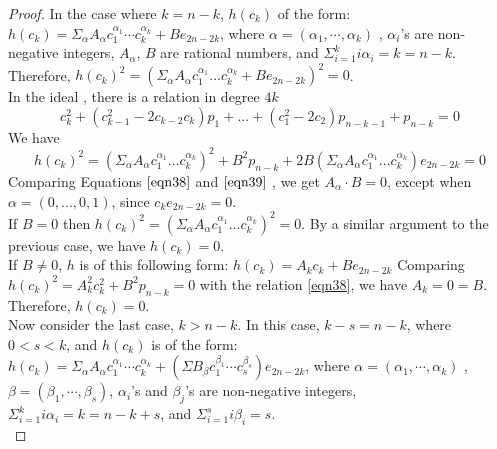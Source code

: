 \documentclass[a4paper,leqno,12pt]{amsart}
\theoremstyle{plain}
\theoremstyle{definition}
\theoremstyle{remark}
\begin{document}
{\begin{proof}
\noindent
In the case where $k = n-k$,    $h(c_{k})$ of the form:  
$h(c_{k}) = \Sigma_{\alpha} A_{\alpha} c_{1}^{\alpha_{1}} \cdots c_{k}^{\alpha_{k}} + Be_{2n-2k}$,  
where $\alpha = (\alpha_{1} ,  \cdots ,  \alpha_{k})$ ,  $\alpha_{i}$'s are non-negative integers,  $A_{\alpha}$,  $B$ are rational numbers,  and $\Sigma_{i=1}^{k} i \alpha_{i} = k = n-k$.    Therefore,  $h(c_{k})^{2}= (\Sigma_{\alpha} A_{\alpha} c_{1}^{\alpha_{1}}\dots c_{k}^{\alpha_{k}}+Be_{2n-2k})^{2}=0$. \\
In the  ideal ,  there is a relation in degree $4k$ 
\begin{equation}
\label{eqn38}
    c_{k}^{2}+(c_{k-1}^{2}-2c_{k-2}c_{k})p_{1}+...+(c_{1}^{2}-2c_{2})p_{n-k-1}+p_{n-k}=0
\end{equation}
\noindent
We have 
 \begin{equation}
 \label{eqn39}
    h(c_{k})^{2}= (\Sigma_{\alpha} A_{\alpha} c_{1}^{\alpha_{1}}\dots c_{k}^{\alpha_{k}})^{2}+B^{2}p_{n-k}+2B(\Sigma_{\alpha} A_{\alpha} c_{1}^{\alpha_{1}}\dots c_{k}^{\alpha_{k}})e_{2n-2k} = 0
 \end{equation}
\noindent
Comparing  Equations $\ref{eqn38}$ and $\ref{eqn39}$ , we get $A_{\alpha} \cdot B=0$,  except when $\alpha=(0,...,0,1)$,  since $c_{k}e_{2n-2k}=0$. \\

\noindent
If $B=0$ then $h(c_{k})^{2}=(\Sigma_{\alpha} A_{\alpha} c_{1}^{\alpha_{1}}\dots c_{k}^{\alpha_{k}})^{2} = 0$.  By a similar argument to the previous case,  we have  $h(c_{k})=0$.\\
  \noindent
If $B\neq 0$,  $h$ is of this following form: $h(c_{k})=A_{k}c_{k}+Be_{2n-2k}$
Comparing $h(c_{k})^{2}=A_{k}^{2}c_{k}^{2}+B^{2}p_{n-k} = 0$ with the relation \ref{eqn38},  we have $A_{k}=0=B$.  Therefore,  $h(c_{k})=0$.\\

\noindent
Now consider the last case,  $k>n-k$.  In this case,   $k-s = n-k$,  where $0<s<k$,  and $h(c_{k})$ is of the form: 
 $h(c_{k}) = \Sigma_{\alpha} A_{\alpha} c_{1}^{\alpha_{1}} \cdots c_{k}^{\alpha_{k}} + (\Sigma B_{\beta} c_{1}^{\beta_{1}} \cdots c_{s}^{\beta_{s}})e_{2n-2k}$, 
where $\alpha = (\alpha_{1} ,  \cdots ,  \alpha_{k})$ ,  $\beta = (\beta_{1} ,  \cdots ,  \beta_{s})$, $\alpha_{i}$'s and $\beta_{j}$'s are non-negative integers,   $\Sigma_{i=1}^{k} i \alpha_{i} = k = n-k+s$,  and $\Sigma_{i=1}^{s} i \beta_{i} = s$.   \\


\end{proof}}
\end{document}
